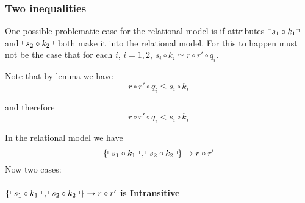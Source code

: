 \subsubsection{Two inequalities}
One possible problematic case for the relational model is if attributes $\left\ulcorner s_1 \circ k_1\right\urcorner$ and $\left\ulcorner s_2 \circ k_2\right\urcorner$ both make it into the relational model. For this to happen must \underline{not}  be the case that for each
$i$, $i = 1,2$, $s_i \circ k_i \simeq r \circ r' \circ q_i$. 

Note that by lemma  we have
\begin{equation}
\label{clauseiiifailureinequality}
r \circ r' \circ q_i \leq s_i \circ k_i
\end{equation}

and therefore 
\begin{equation}
\label{clauseiiifailureinequality}
r \circ r' \circ q_i < s_i \circ k_i
\end{equation}

In the relational model we have
\begin{equation}
\label{errantfd}
\left\{\left\ulcorner s_1 \circ k_1\right\urcorner,\left\ulcorner s_2 \circ k_2\right\urcorner\right\} \rightarrow r \circ r'
\end{equation}
Now two cases: 
\paragraph{ $\left\{\left\ulcorner s_1 \circ k_1\right\urcorner,\left\ulcorner s_2 \circ k_2\right\urcorner\right\} \rightarrow r \circ r'$ is Intransitive}

